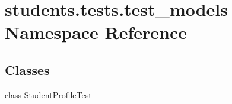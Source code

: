 \hypertarget{namespacestudents_1_1tests_1_1test__models}{\section{students.\-tests.\-test\-\_\-models Namespace Reference}
\label{namespacestudents_1_1tests_1_1test__models}
}
\subsection*{Classes}
\begin{DoxyCompactItemize}
\item 
class \hyperlink{classstudents_1_1tests_1_1test__models_1_1_student_profile_test}{Student\-Profile\-Test}
\end{DoxyCompactItemize}
